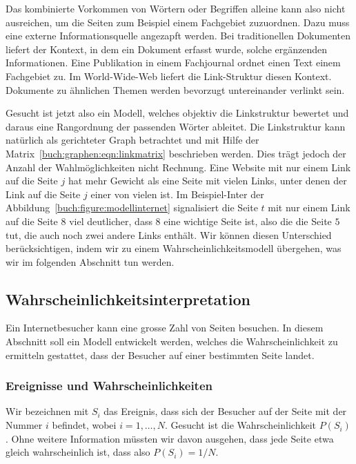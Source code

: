 Das kombinierte Vorkommen von Wörtern oder Begriffen alleine kann also 
nicht ausreichen, um die Seiten zum Beispiel einem Fachgebiet zuzuordnen.
Dazu muss eine externe Informationsquelle angezapft werden.
Bei traditionellen Dokumenten liefert der Kontext, in dem ein
Dokument erfasst wurde, solche ergänzenden Informationen.
Eine Publikation in einem Fachjournal ordnet einen Text einem Fachgebiet zu.
Im World-Wide-Web liefert die Link-Struktur diesen Kontext.
Dokumente zu ähnlichen Themen werden bevorzugt untereinander verlinkt
sein.

Gesucht ist jetzt also ein Modell, welches objektiv die Linkstruktur
bewertet und daraus eine Rangordnung der passenden Wörter ableitet.
Die Linkstruktur kann natürlich als gerichteter Graph betrachtet und 
mit Hilfe der Matrix~\eqref{buch:graphen:eqn:linkmatrix}
beschrieben werden.
Dies trägt jedoch der Anzahl der Wahlmöglichkeiten nicht Rechnung.
Eine Website mit nur einem Link auf die Seite $j$ hat mehr Gewicht
als eine Seite mit vielen Links, unter denen der Link auf die Seite $j$
einer von vielen ist.
Im Beispiel-Inter der Abbildung~\ref{buch:figure:modellinternet}
signalisiert die Seite $t$ mit nur einem Link auf die Seite $8$
viel deutlicher, dass $8$ eine wichtige Seite ist, also die die
Seite $5$ tut, die auch noch zwei andere Links enthält.
Wir können diesen Unterschied berücksichtigen, indem wir zu einem
Wahrscheinlichkeitsmodell übergehen, was wir im folgenden Abschnitt
tun werden.


%
%
\subsection{Wahrscheinlichkeitsinterpretation
\label{buch:subsection:wahrscheinlichkeitsinterpretation}}
Ein Internetbesucher kann eine grosse Zahl von Seiten besuchen.
In diesem Abschnitt soll ein Modell entwickelt werden, welches die
Wahrscheinlichkeit zu ermitteln gestattet, dass der Besucher auf
einer bestimmten Seite landet.

\subsubsection{Ereignisse und Wahrscheinlichkeiten}
Wir bezeichnen mit $S_i$ das Ereignis, dass sich der Besucher auf
der Seite mit der Nummer $i$ befindet, wobei $i=1,\dots,N$.
Gesucht ist die Wahrscheinlichkeit $P(S_i)$.
Ohne weitere Information müssten wir davon ausgehen, dass jede Seite
etwa gleich wahrscheinlich ist, dass also $P(S_i) = 1/N$.

